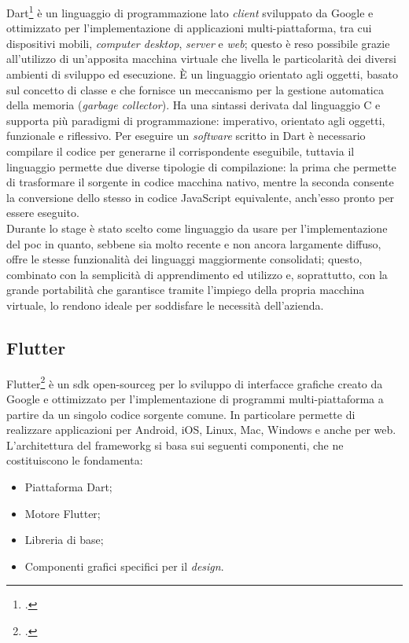 Dart\footcite{site:dart} è un linguaggio di programmazione lato \textit{client} sviluppato da Google e ottimizzato per l'implementazione di applicazioni multi-piattaforma, tra cui dispositivi mobili, \textit{computer desktop}, \textit{server} e \textit{web}; questo è reso possibile grazie all'utilizzo di un'apposita macchina virtuale che livella le particolarità dei diversi ambienti di sviluppo ed esecuzione. È un linguaggio orientato agli oggetti, basato sul concetto di classe e che fornisce un meccanismo per la gestione automatica della memoria (\textit{garbage collector}). Ha una sintassi derivata dal linguaggio C e supporta più paradigmi di programmazione: imperativo, orientato agli oggetti, funzionale e riflessivo. Per eseguire un \textit{software} scritto in Dart è necessario compilare il codice per generarne il corrispondente eseguibile, tuttavia il linguaggio permette due diverse tipologie di compilazione: la prima che permette di trasformare il sorgente in codice macchina nativo, mentre la seconda consente la conversione dello stesso in codice JavaScript equivalente, anch'esso pronto per essere eseguito.\\
Durante lo stage è stato scelto come linguaggio da usare per l'implementazione del \gls{poc} in quanto, sebbene sia molto recente e non ancora largamente diffuso, offre le stesse funzionalità dei linguaggi maggiormente consolidati; questo, combinato con la semplicità di apprendimento ed utilizzo e, soprattutto, con la grande portabilità che garantisce tramite l'impiego della propria macchina virtuale, lo rendono ideale per soddisfare le necessità dell'azienda.

\subsection{Flutter}

Flutter\footcite{site:flutter} è un \gls{sdk}\glsfirstoccur{} \gls{open-sourceg} per lo sviluppo di interfacce grafiche creato da Google e ottimizzato per l'implementazione di programmi multi-piattaforma a partire da un singolo codice sorgente comune. In particolare permette di realizzare applicazioni per Android, iOS, Linux, Mac, Windows e anche per web.\\
L'architettura del \gls{frameworkg}\glsfirstoccur{} si basa sui seguenti componenti, che ne costituiscono le fondamenta:

\begin{itemize}
	\item Piattaforma Dart;
	\item Motore Flutter;
	\item Libreria di base;
	\item Componenti grafici specifici per il \textit{design}.
\end{itemize}

